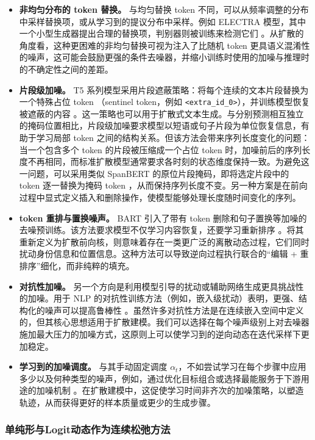 \begin{itemize}
\item \textbf{非均匀分布的 token 替换。}
与均匀替换 token 不同，可以从频率调整的分布中采样替换项，或从学习到的提议分布中采样。例如 ELECTRA 模型，其中一个小型生成器提出合理的替换项，判别器则被训练来检测它们 \citep{clark-etal:2019electra}。从扩散的角度看，这种更困难的非均匀替换可视为注入了比随机 token 更具语义混淆性的噪声，这可能会鼓励更强的条件去噪器，并缩小训练时使用的加噪与推理时的不确定性之间的差距。
\item \textbf{片段级加噪。}
T5 系列模型采用片段遮蔽策略：将每个连续的文本片段替换为一个特殊占位 token （sentinel token，例如 \texttt{<extra\_id\_0>}），并训练模型恢复被遮蔽的内容
\citep{raffel-etal:2020exploring}。这一策略也可以用于扩散式文本生成。与分别预测相互独立的掩码位置相比，片段级加噪要求模型以短语或句子片段为单位恢复信息，有助于学习局部 token 之间的结构关系。但该方法会带来序列长度变化的问题：当一个包含多个 token 的片段被压缩成一个占位 token 时，加噪前后的序列长度不再相同，而标准扩散模型通常要求各时刻的状态维度保持一致。为避免这一问题，可以采用类似 SpanBERT 的原位片段掩码\citep{joshi-etal:2020spanbert}，即将选定片段中的 token 逐一替换为掩码 token ，从而保持序列长度不变。另一种方案是在前向过程中显式定义插入和删除操作，使模型能够处理长度随时间变化的序列\citep{gu-etal:2019levenshtein,reid-etal:2022diffuser}。
\item \textbf{ token 重排与置换噪声。}
BART 引入了带有 token 删除和句子置换等加噪的去噪预训练。该方法要求模型不仅学习内容恢复，还要学习重新排序 \citep{lewis-etal:2020bart}。将其重新定义为扩散前向核，则意味着存在一类更广泛的离散动态过程，它们同时扰动身份信息和位置信息。这种方法可以导致逆向过程执行联合的“编辑 + 重排序”细化，而非纯粹的填充。
\item \textbf{对抗性加噪。}
另一个方向是利用模型引导的扰动或辅助网络生成更具挑战性的加噪。用于 NLP 的对抗性训练方法（例如，嵌入级扰动）表明，更强、结构化的噪声可以提高鲁棒性 \citep{zhu-etal:2020freelb}。虽然许多对抗性方法是在连续嵌入空间中定义的，但其核心思想适用于扩散建模。我们可以选择在每个噪声级别上对去噪器施加最大压力的加噪方式，这原则上可以使学习到的逆向动态在迭代采样下更加稳定。
\item \textbf{学习到的加噪调度。}
与其手动固定调度 $\alpha_t$，不如尝试学习在每个步骤中应用多少以及何种类型的噪声，例如，通过优化目标组合或选择最能服务于下游用途的加噪机制 \citep{tay-etal:2023ul2}。在扩散建模中，这促使学习时间非齐次的加噪策略，以塑造轨迹，从而获得更好的样本质量或更少的生成步骤。
\end{itemize}
\subsubsection{单纯形与Logit动态作为连续松弛方法}

